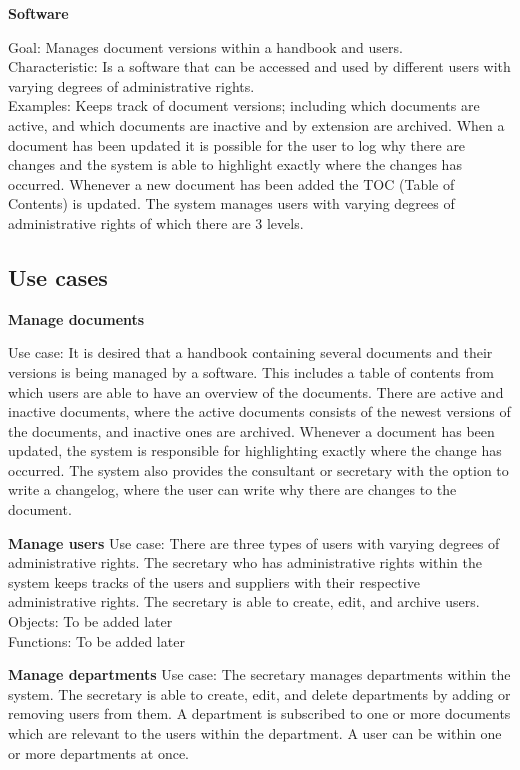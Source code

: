 \textbf{Software}

Goal: Manages document versions within a handbook and users.
\\
Characteristic: Is a software that can be accessed and used by different users with varying degrees of administrative rights.
\\
Examples: Keeps track of document versions; including which documents are active, and which documents are inactive and by extension are archived. When a document has been updated it is possible for the user to log why there are changes and the system is able to highlight exactly where the changes has occurred. Whenever a new document has been added the TOC (Table of Contents) is updated. The system manages users with varying degrees of administrative rights of which there are 3 levels.


\subsection{Use cases}

\textbf{Manage documents}

Use case: It is desired that a handbook containing several documents and their versions is being managed by a software. This includes a table of contents from which users are able to have an overview of the documents. There are active and inactive documents, where the active documents consists of the newest versions of the documents, and inactive ones are archived. Whenever a document has been updated, the system is responsible for highlighting exactly where the change has occurred. The system also provides the consultant or secretary with the option to write a changelog, where the user can write why there are changes to the document.

\textbf{Manage users}
Use case: There are three types of users with varying degrees of administrative rights. The secretary who has administrative rights within the system keeps tracks of the users and suppliers with their respective administrative rights. The secretary is able to create, edit, and archive users.
\\
Objects: To be added later
\\
Functions: To be added later

\textbf{Manage departments}
Use case: The secretary manages departments within the system. The secretary is able to create, edit, and delete departments by adding or removing users from them. A department is subscribed to one or more documents which are relevant to the users within the department. A user can be within one or more departments at once.

